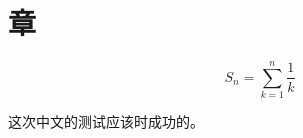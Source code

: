 \documentclass[a4paper]{article}
\title{}
\author{}
\begin{document}
\maketitle

\begin{abstract}

\end{abstract}

\section{章}

$$S_n=\sum\limits_{k=1}^n\frac{1}{k}$$

这次中文的测试应该时成功的。
\end{document}
